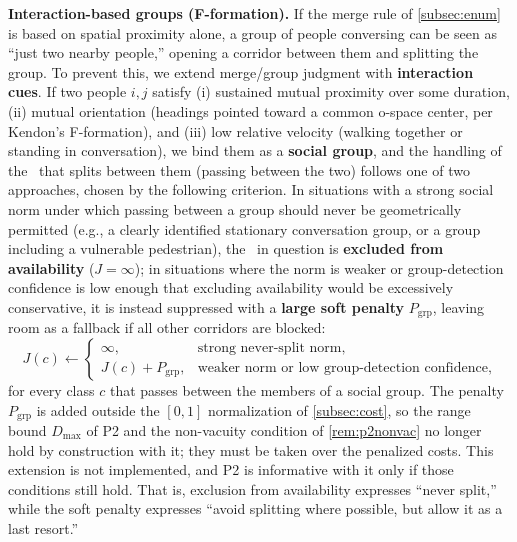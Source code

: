 \noindent\textbf{Interaction-based groups (F-formation).} If the merge rule of \cref{subsec:enum} is based on spatial proximity alone, a group of people conversing can be seen as ``just two nearby people,'' opening a corridor between them and splitting the group. To prevent this, we extend merge/group judgment with \textbf{interaction cues}. If two people $i,j$ satisfy (i) sustained mutual proximity over some duration, (ii) mutual orientation (headings pointed toward a common o-space center, per Kendon's F-formation), and (iii) low relative velocity (walking together or standing in conversation), we bind them as a \textbf{social group}, and the handling of the \Class\ that splits between them (passing between the two) follows one of two approaches, chosen by the following criterion. In situations with a strong social norm under which passing between a group should never be geometrically permitted (e.g., a clearly identified stationary conversation group, or a group including a vulnerable pedestrian), the \Class\ in question is \textbf{excluded from availability} ($J = \infty$); in situations where the norm is weaker or group-detection confidence is low enough that excluding availability would be excessively conservative, it is instead suppressed with a \textbf{large soft penalty} $P_{\text{grp}}$, leaving room as a fallback if all other corridors are blocked:
\begin{equation}
J(c) \leftarrow \begin{cases} \infty, & \text{strong never-split norm},\\ J(c)+P_{\text{grp}}, & \text{weaker norm or low group-detection confidence}, \end{cases}
\label{eq:group}
\end{equation}
for every class $c$ that passes between the members of a social group. The penalty $P_{\text{grp}}$ is added outside the $[0,1]$ normalization of \cref{subsec:cost}, so the range bound $D_{\max}$ of P2 and the non-vacuity condition of \cref{rem:p2nonvac} no longer hold by construction with it; they must be taken over the penalized costs. This extension is not implemented, and P2 is informative with it only if those conditions still hold.
 That is, exclusion from availability expresses ``never split,'' while the soft penalty expresses ``avoid splitting where possible, but allow it as a last resort.''

